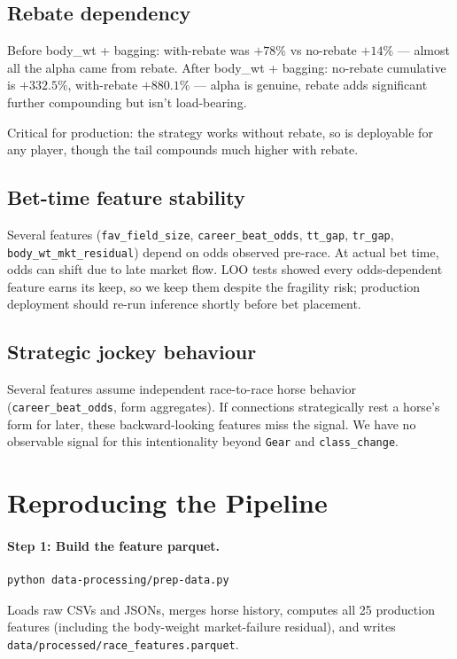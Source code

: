 \documentclass[11pt]{article}
\begin{document}
\subsection{Rebate dependency}

Before body\_wt + bagging: with-rebate was $+78\%$ vs no-rebate $+14\%$
--- almost all the alpha came from rebate. After body\_wt + bagging:
no-rebate cumulative is $+332.5\%$, with-rebate $+880.1\%$ --- alpha
is genuine, rebate adds significant further compounding but isn't
load-bearing.

Critical for production: the strategy works without rebate, so is
deployable for any player, though the tail compounds much higher with
rebate.

\subsection{Bet-time feature stability}

Several features (\texttt{fav\_field\_size}, \texttt{career\_beat\_odds},
\texttt{tt\_gap}, \texttt{tr\_gap}, \texttt{body\_wt\_mkt\_residual})
depend on odds observed pre-race. At actual bet time, odds can shift
due to late market flow. LOO tests showed every odds-dependent feature
earns its keep, so we keep them despite the fragility risk; production
deployment should re-run inference shortly before bet placement.

\subsection{Strategic jockey behaviour}

Several features assume independent race-to-race horse behavior
(\texttt{career\_beat\_odds}, form aggregates). If connections
strategically rest a horse's form for later, these backward-looking
features miss the signal. We have no observable signal for this
intentionality beyond \texttt{Gear} and \texttt{class\_change}.

\section{Reproducing the Pipeline}

\paragraph{Step 1: Build the feature parquet.}
\begin{verbatim}
python data-processing/prep-data.py
\end{verbatim}
Loads raw CSVs and JSONs, merges horse history, computes all 25
production features (including the body-weight market-failure residual),
and writes \texttt{data/processed/race\_features.parquet}.
\end{document}
